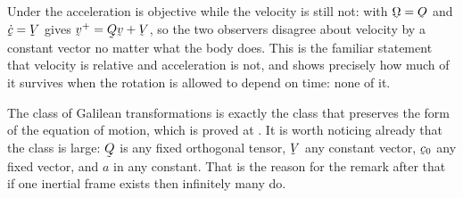 \begin{remark}\label{rem:ch7galilean}
Under  the acceleration is objective while the velocity is
still not:  with $\bOm=\Ob$ and $\dot\bc=\bV$ gives
$\bv^{+}=\bQ\bv+\bV$, so the two observers disagree about velocity by a
constant vector no matter what the body does. This is the familiar
statement that velocity is relative and acceleration is not, and
 shows precisely how much of it survives when the rotation is
allowed to depend on time: none of it.

The class of Galilean transformations is exactly the class that preserves
the form of the equation of motion, which is proved at . It is
worth noticing already that the class is large: $\bQ$ is any fixed
orthogonal tensor, $\bV$ any constant vector, $\bc_{0}$ any fixed vector,
and $a$ in  any constant. That is the reason for the remark
after  that if one inertial frame exists then infinitely many
do.
\end{remark}


